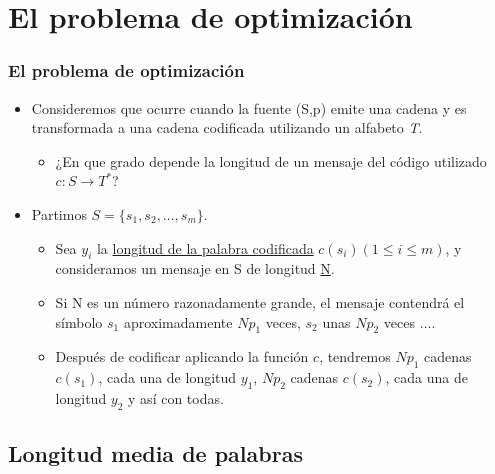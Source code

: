 \documentclass{beamer}
\begin{document}
\section{El problema de optimización}

\begin{frame}  \small \frametitle{El problema de optimización}

\begin{itemize}
\item Consideremos que ocurre cuando la fuente (S,p) emite una cadena y es transformada a una cadena codificada utilizando un alfabeto \textit{T}. 

\begin{itemize}
\item ¿En que grado depende la longitud de un mensaje del código utilizado $c: S\rightarrow T^{*}$?
\end{itemize}

\item Partimos $S = \{s_1, s_2, \ldots , s_m\}$.  

\begin{itemize}
\item Sea $y_i$ la \underline{longitud de la palabra codificada} $c(s_i) (1\leq i \leq m)$, y consideramos un mensaje en S de longitud \underline{N}. 
\item Si N es un número razonadamente grande, el mensaje contendrá el símbolo $s_1$ aproximadamente $Np_1$ veces, $s_2$ unas $Np_2$ veces $\ldots$. 

\item Después de codificar aplicando la función $c$,  tendremos $Np_1$  cadenas $c(s_1)$, cada una de longitud $y_1$,  $Np_2$  cadenas $c(s_2)$, cada una de longitud $y_2$ y así con todas.
\end{itemize}



\end{itemize}

\end{frame} 

\subsection{Longitud media de palabras}
\end{document}
